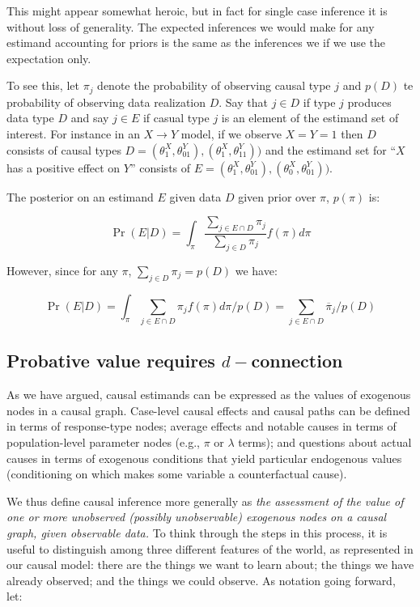 \documentclass[12pt,]{book}
\begin{document}
This might appear somewhat heroic, but in fact for single case inference it is without loss of generality. The expected inferences we would make for any estimand accounting for priors is the same as the inferences we if we use the expectation only.

To see this, let \(\pi_j\) denote the probability of observing causal type \(j\) and \(p(D)\) te probability of observing data realization \(D\). Say that \(j \in D\) if type \(j\) produces data type \(D\) and say \(j \in E\) if casual type \(j\) is an element of the estimand set of interest. For instance in an \(X \rightarrow Y\) model, if we observe \(X=Y=1\) then \(D\) consists of causal types \(D={(\theta^X_1, \theta^Y_{01}), (\theta^X_1, \theta^Y_{11})})\) and the estimand set for ``\(X\) has a positive effect on \(Y\)'' consists of \(E={(\theta^X_1, \theta^Y_{01}), (\theta^X_0, \theta^Y_{01})})\).

The posterior on an estimand \(E\) given data \(D\) given prior over \(\pi\), \(p(\pi)\) is:

\[\Pr(E | D) = \int_\pi  \frac{\sum_{j \in E \cap D}\pi_j}{\sum_{j \in D}\pi_j} f(\pi)d\pi\]

However, since for any \(\pi\), \(\sum_{j \in D}\pi_j = p(D)\) we have:

\[\Pr(E | D) = \int_\pi  \sum_{j \in E \cap D}\pi_j f(\pi)d\pi/p(D) = \sum_{j \in  E \cap D} \overline{\pi}_j/p(D)\]

\hypertarget{probative-value-requires-d-connection}{%
\subsection{\texorpdfstring{Probative value requires \(d-\)connection}{Probative value requires d-connection}}\label{probative-value-requires-d-connection}}

As we have argued, causal estimands can be expressed as the values of exogenous nodes in a causal graph. Case-level causal effects and causal paths can be defined in terms of response-type nodes; average effects and notable causes in terms of population-level parameter nodes (e.g., \(\pi\) or \(\lambda\) terms); and questions about actual causes in terms of exogenous conditions that yield particular endogenous values (conditioning on which makes some variable a counterfactual cause).

We thus define causal inference more generally as \emph{the assessment of the value of one or more unobserved (possibly unobservable) exogenous nodes on a causal graph, given observable data.} To think through the steps in this process, it is useful to distinguish among three different features of the world, as represented in our causal model: there are the things we want to learn about; the things we have already observed; and the things we could observe. As notation going forward, let:
\end{document}

